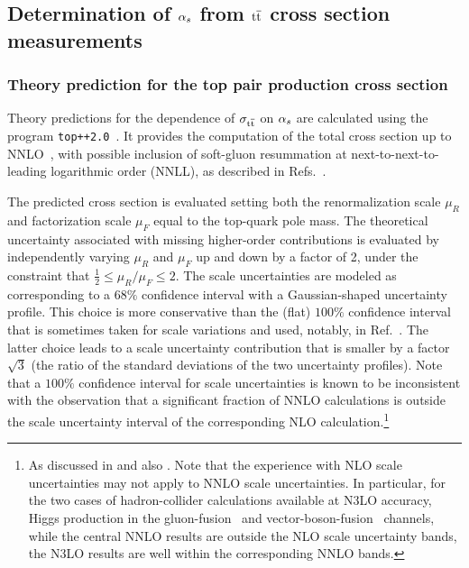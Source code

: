 \subsection{Determination of \texorpdfstring{$\alpha_s$}{alphas} from \texorpdfstring{$\mathrm{t}\overline{\mathrm{t}}$}{tt} cross section measurements}

\subsubsection{Theory prediction for the top pair production cross section}
\label{sec:theory-predictions}

Theory predictions for the dependence of $\sigma_{\mathrm{t}\overline{\mathrm{t}}}$ on $\alpha_s$ are
calculated using the program
\texttt{top++2.0}~\cite{Czakon:2011xx}. 
%
It provides the computation of the total cross section up to
NNLO~\cite{Czakon:2013goa}, with possible inclusion of soft-gluon
resummation at next-to-next-to-leading logarithmic order (NNLL), as
described in Refs.~\cite{Beneke:2009rj,Czakon:2009zw}.

The predicted cross section is evaluated setting both the
renormalization scale $\mu_R$ and factorization scale $\mu_F$ equal to
the top-quark pole mass. 
%
The theoretical uncertainty associated with missing higher-order
contributions is evaluated by independently varying $\mu_R$ and $\mu_F$
up and down by a factor of 2, under the constraint that
$\frac{1}{2} \leq \mu_R / \mu_F \leq 2$.
%
The scale uncertainties are modeled as corresponding to a $68\%$
confidence interval with a Gaussian-shaped uncertainty profile.
%
This choice is more conservative than the (flat) $100\%$ confidence
interval that is sometimes taken for scale variations and used,
notably, in Ref.~\cite{Chatrchyan:2013haa}. 
%
The latter choice leads to a scale
uncertainty contribution that is smaller by a factor $\sqrt{3}$ (the
ratio of the standard deviations of the two uncertainty profiles).
%
Note that a $100\%$ confidence
interval for scale uncertainties is known to be inconsistent with the
observation that a significant fraction of NNLO calculations is
outside the scale uncertainty interval of the corresponding NLO
calculation.\footnote{As discussed in \cite{Bagnaschi:2014wea} and
  also \cite{GavinLHCPtalk}. 
  Note that the experience with NLO scale uncertainties may not apply
  to NNLO scale uncertainties.
  In particular, for the two cases of hadron-collider calculations
  available at N3LO accuracy, Higgs production in the
  gluon-fusion~\cite{Anastasiou:2016cez} and
  vector-boson-fusion~\cite{Dreyer:2016oyx} channels, while the
  central NNLO results are outside the NLO scale uncertainty bands, the N3LO
  results are well within the corresponding NNLO bands. }

